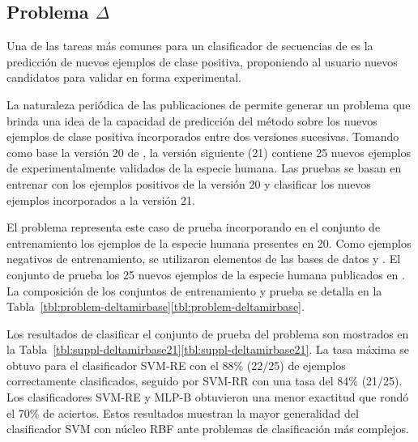 %
%
\subsection{Problema $\mathbf{\mathsf{\Delta}}$\mirbase}
%
Una de las tareas más comunes para un clasificador de secuencias de
 es la predicción de nuevos ejemplos de clase positiva,
proponiendo al usuario nuevos {candidatos} para validar en forma
experimental.

La naturaleza periódica de las publicaciones de \work\mirbase{}
permite generar un problema que brinda una idea de la capacidad de
predicción del método sobre los nuevos ejemplos de clase positiva
incorporados entre dos versiones sucesivas.
Tomando como base la versión 20 de \work\mirbase, la versión siguiente
(21) contiene 25 nuevos ejemplos de  experimentalmente
validados de la especie humana.
Las pruebas se basan en entrenar con los ejemplos positivos de la
versión 20 y clasificar los nuevos ejemplos incorporados a la versión
21.

El problema \deltamirbase{} representa este caso de prueba
incorporando en el conjunto de entrenamiento  los ejemplos de
la especie humana presentes en \work\mirbase{} 20.
Como ejemplos negativos de entrenamiento, se utilizaron elementos de
las bases de datos  \cite{xue} y 
\cite{batuwita}.
El conjunto de prueba los 25 nuevos ejemplos de la especie humana
publicados en \work{}.
La composición de los conjuntos de entrenamiento y prueba se detalla en
la \iflatexml{}Tabla~\ref{tbl:problem-deltamirbase}\else\autoref{tbl:problem-deltamirbase}\fi.

Los resultados de clasificar el conjunto de prueba del problema
\prob\deltamirbase{} son mostrados en la
\iflatexml{}Tabla~\ref{tbl:suppl-deltamirbase21}\else\autoref{tbl:suppl-deltamirbase21}\fi.
La tasa máxima se obtuvo para el clasificador SVM-RE con el 88\%
(22/25) de ejemplos correctamente clasificados, seguido por SVM-RR con
una tasa del 84\% (21/25).
Los clasificadores SVM-RE y MLP-B obtuvieron una menor exactitud que
rondó el 70\% de aciertos.
Estos resultados muestran la mayor generalidad del clasificador SVM
con núcleo RBF ante problemas de clasificación más complejos.
